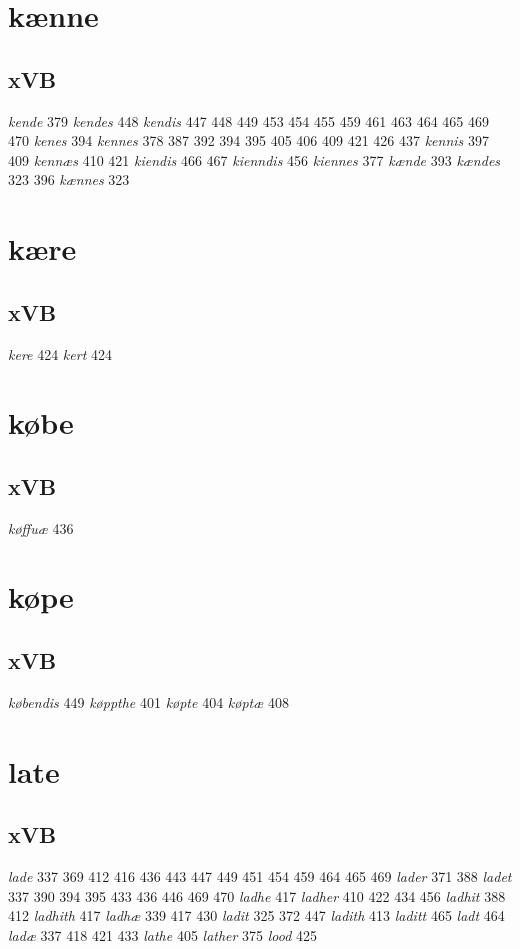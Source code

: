 \documentclass[a4paper,twocolumn]{article}
\begin{document}
\section{kænne}
\label{sec:org308c692}
\subsection{xVB}
\label{sec:org39920db}
\emph{kende} 379 \emph{kendes} 448 \emph{kendis} 447 448 449 453 454 455 459 461 463 464 465 469 470 \emph{kenes} 394 \emph{kennes} 378 387 392 394 395 405 406 409 421 426 437 \emph{kennis} 397 409 \emph{kennæs} 410 421 \emph{kiendis} 466 467 \emph{kienndis} 456 \emph{kiennes} 377 \emph{kænde} 393 \emph{kændes} 323 396 \emph{kænnes} 323 
\section{kære}
\label{sec:orga5fbafc}
\subsection{xVB}
\label{sec:org80d217e}
\emph{kere} 424 \emph{kert} 424 
\section{købe}
\label{sec:orgaf1b523}
\subsection{xVB}
\label{sec:org05d7942}
\emph{køffuæ} 436 
\section{køpe}
\label{sec:org8702dde}
\subsection{xVB}
\label{sec:orgc5578e3}
\emph{købendis} 449 \emph{køppthe} 401 \emph{køpte} 404 \emph{køptæ} 408 
\section{late}
\label{sec:orga9588a8}
\subsection{xVB}
\label{sec:org433da4c}
\emph{lade} 337 369 412 416 436 443 447 449 451 454 459 464 465 469 \emph{lader} 371 388 \emph{ladet} 337 390 394 395 433 436 446 469 470 \emph{ladhe} 417 \emph{ladher} 410 422 434 456 \emph{ladhit} 388 412 \emph{ladhith} 417 \emph{ladhæ} 339 417 430 \emph{ladit} 325 372 447 \emph{ladith} 413 \emph{laditt} 465 \emph{ladt} 464 \emph{ladæ} 337 418 421 433 \emph{lathe} 405 \emph{lather} 375 \emph{lood} 425 
\end{document}

